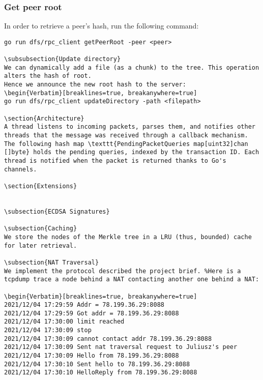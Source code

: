 \documentclass[12pt,a4paper]{article}
\begin{document}
\subsubsection{Get peer root}
In order to retrieve a peer's hash, run the following command:
\begin{Verbatim}[breaklines=true, breakanywhere=true]
go run dfs/rpc_client getPeerRoot -peer <peer>

\subsubsection{Update directory}
We can dynamically add a file (as a chunk) to the tree. This operation alters the hash of root.
Hence we announce the new root hash to the server:
\begin{Verbatim}[breaklines=true, breakanywhere=true]
go run dfs/rpc_client updateDirectory -path <filepath> 

\section{Architecture}
A thread listens to incoming packets, parses them, and notifies other threads that the message was received through a callback mechanism. The following hash map \texttt{PendingPacketQueries map[uint32]chan []byte} holds the pending queries, indexed by the transaction ID. Each thread is notified when the packet is returned thanks to Go's channels.

\section{Extensions}


\subsection{ECDSA Signatures}

\subsection{Caching}
We store the nodes of the Merkle tree in a LRU (thus, bounded) cache for later retrieval.

\subsection{NAT Traversal}
We implement the protocol described the project brief. %Here is a tcpdump trace a node behind a NAT contacting another one behind a NAT:

\begin{Verbatim}[breaklines=true, breakanywhere=true]
2021/12/04 17:29:59 Addr = 78.199.36.29:8088
2021/12/04 17:29:59 Got addr = 78.199.36.29:8088
2021/12/04 17:30:00 limit reached
2021/12/04 17:30:09 stop
2021/12/04 17:30:09 cannot contact addr 78.199.36.29:8088
2021/12/04 17:30:09 Sent nat traversal request to Juliusz's peer
2021/12/04 17:30:09 Hello from 78.199.36.29:8088
2021/12/04 17:30:10 Sent hello to 78.199.36.29:8088
2021/12/04 17:30:10 HelloReply from 78.199.36.29:8088
\end{Verbatim}
\end{document}
